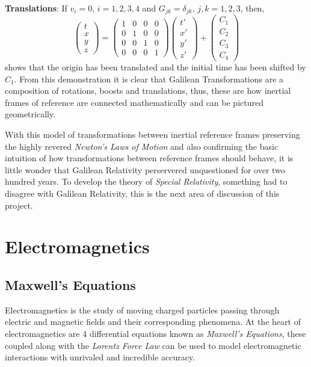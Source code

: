 \documentclass[a4paper,12pt,draft]{report}
\begin{document}
\\
\textbf{Translations}: If $v_i = 0$, $i = 1, 2, 3, 4$ and $G_{jk} = \delta_{jk}$, $j, k = 1, 2, 3$, then,
$$
\begin{pmatrix}t\\x\\y\\z\end{pmatrix} =
\begin{pmatrix}
1 & 0 & 0 & 0\\
0 & 1 & 0 & 0\\
0 & 0 & 1 & 0\\
0 & 0 & 0 & 1
\end{pmatrix}
\begin{pmatrix}t'\\x'\\y'\\z'\end{pmatrix} + \begin{pmatrix}C_1\\C_2\\C_3\\C_4\end{pmatrix}
$$
shows that the origin has been translated and the initial time has been shifted by $C_1$. From this demonstration it is clear that Galilean Transformations are a composition of rotations, boosts and translations, thus, these are how inertial frames of reference are connected mathematically and can be pictured geometrically.

With this model of transformations between inertial reference frames preserving the highly revered \emph{Newton's Laws of Motion} and also confirming the basic intuition of how transformations between reference frames should behave, it is little wonder that Galilean Relativity perservered unquestioned for over two hundred years. To develop the theory of \emph{Special Relativity}, something had to disagree with Galilean Relativity, this is the next area of discussion of this project.


\chapter{Electromagnetics}

\section{Maxwell's Equations}

Electromagnetics is the study of moving charged particles passing through electric and magnetic fields and their corresponding phenomena. At the heart of electromagnetics are 4 differential equations known as \emph{Maxwell's Equations}, these coupled along with the \emph{Lorentz Force Law} can be used to model electromagnetic interactions with unrivaled and incredible accuracy.
\end{document}
